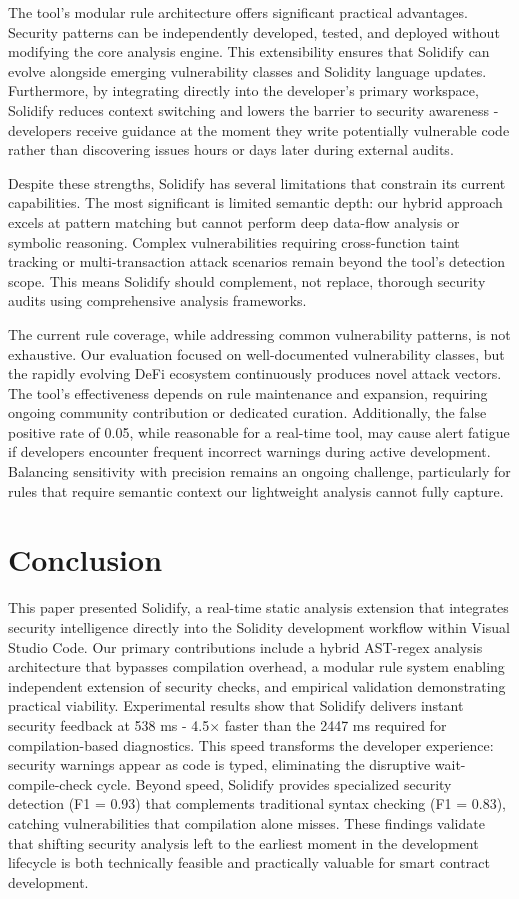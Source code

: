 \documentclass[10pt, a4paper]{article}
\begin{document}
The tool's modular rule architecture offers significant practical advantages. Security patterns can be independently developed, tested, and deployed without modifying the core analysis engine. This extensibility ensures that Solidify can evolve alongside emerging vulnerability classes and Solidity language updates. Furthermore, by integrating directly into the developer's primary workspace, Solidify reduces context switching and lowers the barrier to security awareness - developers receive guidance at the moment they write potentially vulnerable code rather than discovering issues hours or days later during external audits.

Despite these strengths, Solidify has several limitations that constrain its current capabilities. The most significant is limited semantic depth: our hybrid approach excels at pattern matching but cannot perform deep data-flow analysis or symbolic reasoning. Complex vulnerabilities requiring cross-function taint tracking or multi-transaction attack scenarios remain beyond the tool's detection scope. This means Solidify should complement, not replace, thorough security audits using comprehensive analysis frameworks.

The current rule coverage, while addressing common vulnerability patterns, is not exhaustive. Our evaluation focused on well-documented vulnerability classes, but the rapidly evolving DeFi ecosystem continuously produces novel attack vectors. The tool's effectiveness depends on rule maintenance and expansion, requiring ongoing community contribution or dedicated curation. Additionally, the false positive rate of 0.05, while reasonable for a real-time tool, may cause alert fatigue if developers encounter frequent incorrect warnings during active development. Balancing sensitivity with precision remains an ongoing challenge, particularly for rules that require semantic context our lightweight analysis cannot fully capture.

\section{Conclusion}

This paper presented Solidify, a real-time static analysis extension that integrates security intelligence directly into the Solidity development workflow within Visual Studio Code. Our primary contributions include a hybrid AST-regex analysis architecture that bypasses compilation overhead, a modular rule system enabling independent extension of security checks, and empirical validation demonstrating practical viability. Experimental results show that Solidify delivers instant security feedback at 538 ms - 4.5$\times$ faster than the 2447 ms required for compilation-based diagnostics. This speed transforms the developer experience: security warnings appear as code is typed, eliminating the disruptive wait-compile-check cycle. Beyond speed, Solidify provides specialized security detection (F1 = 0.93) that complements traditional syntax checking (F1 = 0.83), catching vulnerabilities that compilation alone misses. These findings validate that shifting security analysis left to the earliest moment in the development lifecycle is both technically feasible and practically valuable for smart contract development.
\end{document}
